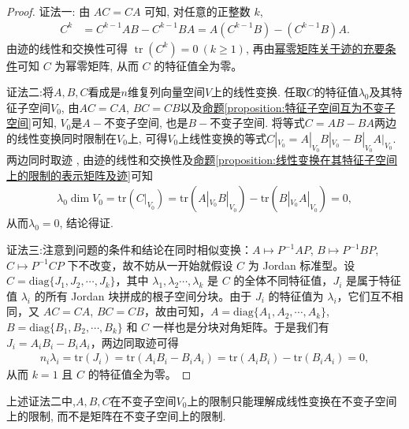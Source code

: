 \documentclass[../../main.tex]{subfiles}%
\begin{document}
\begin{proof}

{\color{blue}证法一:}
由 \(AC = CA\) 可知, 对任意的正整数 \(k\),
\begin{align*}
C^k &= C^{k-1}AB - C^{k-1}BA = A(C^{k-1}B) - (C^{k-1}B)A.
\end{align*}
由迹的线性和交换性可得 \(\operatorname{tr}(C^k) = 0 \ (k \geqslant  1)\), 再由\hyperref[theorem:幂零矩阵关于迹的充要条件]{幂零矩阵关于迹的充要条件}可知 \(C\) 为幂零矩阵, 从而 \(C\) 的特征值全为零。

{\color{blue}证法二:}将\(A,B,C\)看成是\(n\)维复列向量空间\(V\)上的线性变换. 任取\(C\)的特征值\(\lambda_{0}\)及其特征子空间\(V_{0}\), 由\(AC = CA\), \(BC = CB\)以及\hyperref[proposition:特征子空间互为不变子空间]{命题\ref{proposition:特征子空间互为不变子空间}}可知, \(V_{0}\)是\(A -\)不变子空间, 也是\(B -\)不变子空间. 将等式\(C = AB - BA\)两边的线性变换同时限制在\(V_{0}\)上, 可得\(V_{0}\)上线性变换的等式\(C|_{V_{0}}=A|_{V_{0}}B|_{V_{0}}-B|_{V_{0}}A|_{V_{0}}\). 两边同时取迹 , 由迹的线性和交换性及\hyperref[proposition:线性变换在其特征子空间上的限制的表示矩阵及迹]{命题\ref{proposition:线性变换在其特征子空间上的限制的表示矩阵及迹}}可知
\begin{align*}
\lambda_{0}\dim V_{0}=\mathrm{tr}(C|_{V_{0}})=\mathrm{tr}(A|_{V_{0}}B|_{V_{0}})-\mathrm{tr}(B|_{V_{0}}A|_{V_{0}})=0,
\end{align*}
从而\(\lambda_{0}=0\), 结论得证.

{\color{blue}证法三:}注意到问题的条件和结论在同时相似变换：$A \mapsto P^{-1}AP$, $B \mapsto P^{-1}BP$, $C \mapsto P^{-1}CP$ 下不改变，故不妨从一开始就假设 $C$ 为 Jordan 标准型。设 $C = \mathrm{diag}\{J_1, J_2, \cdots, J_k\}$，其中 $\lambda_1, \lambda_2 \cdots, \lambda_k$ 是 $C$ 的全体不同特征值，$J_i$ 是属于特征值 $\lambda_i$ 的所有 Jordan 块拼成的根子空间分块。由于 $J_i$ 的特征值为 $\lambda_i$，它们互不相同，又 $AC = CA$, $BC = CB$，故由可知，$A = \mathrm{diag}\{A_1, A_2, \cdots, A_k\}$, $B = \mathrm{diag}\{B_1, B_2, \cdots, B_k\}$ 和 $C$ 一样也是分块对角矩阵。于是我们有 $J_i = A_iB_i - B_iA_i$，两边同取迹可得
\begin{align*}
n_i\lambda_i = \mathrm{tr}(J_i) = \mathrm{tr}(A_iB_i - B_iA_i) = \mathrm{tr}(A_iB_i) - \mathrm{tr}(B_iA_i) = 0,
\end{align*}
从而 $k = 1$ 且 $C$ 的特征值全为零。

\end{proof}
\begin{remark}
上述{\color{blue}证法二}中,\(A,B,C\)在不变子空间\(V_{0}\)上的限制只能理解成线性变换在不变子空间上的限制, 而不是矩阵在不变子空间上的限制. 
\end{remark}
\end{document}
